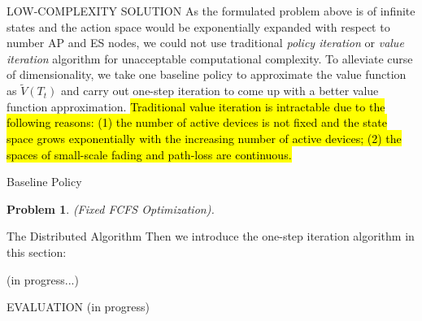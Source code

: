 \documentclass[10pt, conference, letterpaper]{IEEEtran}
\newtheorem{problem}{Problem}
\renewcommand{\vec}{\mathbf}
\begin{document}
    \begin{section}{LOW-COMPLEXITY SOLUTION}
        \label{sec:algorithm}
        As the formulated problem above is of infinite states and the action space would be exponentially expanded with respect to number AP and ES nodes, we could not use traditional \emph{policy iteration} or \emph{value iteration} algorithm \cite{sutton1998introduction} for unacceptable computational complexity. To alleviate curse of dimensionality, we take one baseline policy to approximate the value function as $\tilde{V}(T_t)$ and carry out one-step iteration to come up with a better value function approximation.
        \hl{Traditional value iteration is intractable due to the following reasons: (1) the number of active devices is not fixed and the state space grows exponentially with the increasing number of active devices; (2) the spaces of small-scale fading and path-loss are continuous.}

        \begin{subsection}{Baseline Policy}
            \begin{problem}
                (Fixed FCFS Optimization).
            \end{problem}
        \end{subsection}

        \begin{subsection}{The Distributed Algorithm}
            Then we introduce the one-step iteration algorithm in this section:
            \begin{algorithm}[H]
                \caption{Distributed Algorithm for $k$-th AP}
                \begin{algorithmic}
                    \WHILE{\TRUE}
                        \STATE (in progress...)
                    \ENDWHILE
                \end{algorithmic}
            \end{algorithm}
        \end{subsection}
        
    \end{section}

    \begin{section}{EVALUATION}
        \label{sec:evaluation}
        (in progress)
    \end{section}
\end{document}
